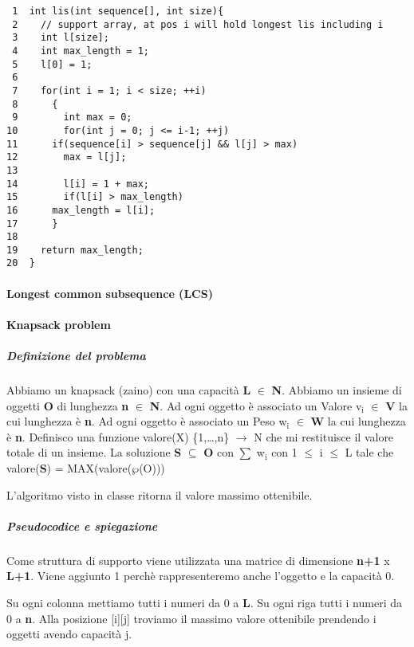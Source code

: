 \documentclass[11pt]{article}
\begin{document}
\begin{verbatim}
 1  int lis(int sequence[], int size){
 2    // support array, at pos i will hold longest lis including i
 3    int l[size]; 
 4    int max_length = 1;
 5    l[0] = 1;
 6  
 7    for(int i = 1; i < size; ++i)
 8      {
 9        int max = 0;
10        for(int j = 0; j <= i-1; ++j)
11  	if(sequence[i] > sequence[j] && l[j] > max)
12  	  max = l[j];
13  
14        l[i] = 1 + max;
15        if(l[i] > max_length)
16  	max_length = l[i];
17      }
18  
19    return max_length;
20  }
\end{verbatim}


\paragraph{Longest common subsequence (LCS)}
\label{sec:org9fe2f4b}


\paragraph{Knapsack problem}
\label{sec:org50233b5}

\subparagraph{Definizione del problema}
\label{sec:orgafbb1ca}

Abbiamo un knapsack (zaino) con una capacità \textbf{L} \(\in\) \textbf{N}.
Abbiamo un insieme di oggetti \textbf{O} di lunghezza \textbf{n} \(\in\) \textbf{N}.
Ad ogni oggetto è associato un Valore  v\(_{\text{i}}\) \(\in\) \textbf{V} la cui lunghezza è \textbf{n}.
Ad ogni oggetto è associato un Peso w\(_{\text{i}}\) \(\in\) \textbf{W} la cui lunghezza è \textbf{n}.
Definisco una funzione valore(X) \{1,\ldots{},n\} \(\rightarrow\) N che mi restituisce il valore totale di un insieme.
La soluzione \textbf{S} \(\subseteq\) \textbf{O} con \(\sum\) w\(_{\text{i}}\) con 1 \(\le\) i \(\le\) L tale che valore(\textbf{S}) = MAX(valore(\(\wp\)(O)))    

L'algoritmo visto in classe ritorna il valore massimo ottenibile.



\subparagraph{Pseudocodice e spiegazione}
\label{sec:org653c74a}

Come struttura di supporto viene utilizzata una matrice di dimensione \textbf{n+1} x \textbf{L+1}.
Viene aggiunto 1 perchè rappresenteremo anche l'oggetto e la capacità 0.

Su ogni colonna mettiamo tutti i numeri da 0 a \textbf{L}.
Su ogni riga tutti i numeri da 0 a \textbf{n}.
Alla posizione [i][j] troviamo il massimo valore ottenibile prendendo i oggetti avendo capacità j.
\end{document}
